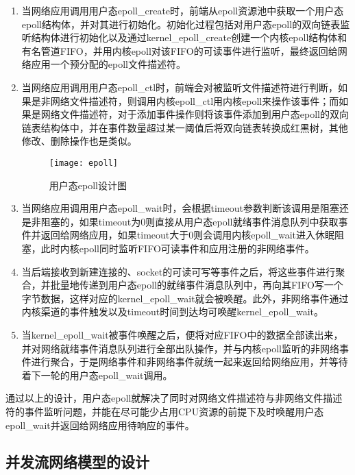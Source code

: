 \begin{enumerate}[(1),labelsep=.5em, leftmargin = 0pt, itemindent = 3em]
\item 当网络应用调用用户态epoll\_create时，前端从epoll资源池中获取一个用户态epoll结构体，并对其进行初始化。初始化过程包括对用户态epoll的双向链表监听结构体进行初始化以及通过kernel\_epoll\_create创建一个内核epoll结构体和有名管道FIFO，并用内核epoll对该FIFO的可读事件进行监听，最终返回给网络应用一个预分配的epoll文件描述符。
\item 当网络应用调用用户态epoll\_ctl时，前端会对被监听文件描述符进行判断，如果是非网络文件描述符，则调用内核epoll\_ctl用内核epoll来操作该事件；而如果是网络文件描述符，对于添加事件操作则将该事件添加到用户态epoll的双向链表结构体中，并在事件数量超过某一阈值后将双向链表转换成红黑树，其他修改、删除操作也是类似。

\vspace{-10pt}
\begin{figure}[H] %
  \centering
  \texttt{[image: epoll]}
  \caption{用户态epoll设计图}
  \label{fig:epoll}
\end{figure}
\vspace{-10pt}

\item 当网络应用调用用户态epoll\_wait时，会根据timeout参数判断该调用是阻塞还是非阻塞的，如果timeout为0则直接从用户态epoll就绪事件消息队列中获取事件并返回给网络应用，如果timeout大于0则会调用内核epoll\_wait进入休眠阻塞，此时内核epoll同时监听FIFO可读事件和应用注册的非网络事件。
\item 当后端接收到新建连接的、socket的可读可写等事件之后，将这些事件进行聚合，并批量地传递到用户态epoll的就绪事件消息队列中，再向其FIFO写一个字节数据，这样对应的kernel\_epoll\_wait就会被唤醒。此外，非网络事件通过内核渠道的事件触发以及timeout时间到达均可唤醒kernel\_epoll\_wait。
\item 当kernel\_epoll\_wait被事件唤醒之后，便将对应FIFO中的数据全部读出来，并对网络就绪事件消息队列进行全部出队操作，并与内核epoll监听的非网络事件进行聚合，于是网络事件和非网络事件就统一起来返回给网络应用，并等待着下一轮的用户态epoll\_wait调用。
\end{enumerate}

通过以上的设计，用户态epoll就解决了同时对网络文件描述符与非网络文件描述符的事件监听问题，并能在尽可能少占用CPU资源的前提下及时唤醒用户态epoll\_wait并返回给网络应用待响应的事件。

\subsection{并发流网络模型的设计}

